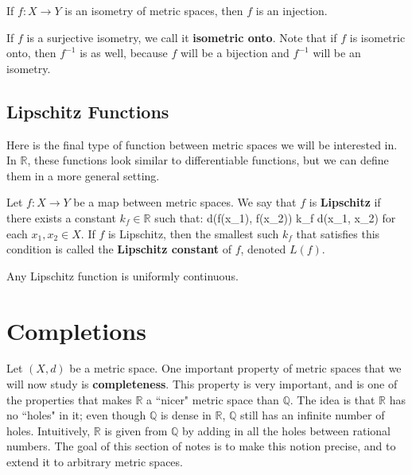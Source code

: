 	\begin{prop}
		If $f : X\rightarrow Y$ is an isometry of metric spaces, then $f$ is an injection.
	\end{prop}
	
	If $f$ is a surjective isometry, we call it \textbf{isometric onto}. Note that if $f$ is isometric onto, then $f^{-1}$ is as well, because $f$ will be a bijection and 
	$f^{-1}$ will be an isometry.
	
	\subsection{Lipschitz Functions}
	
	Here is the final type of function between metric spaces we will be interested in. In $\mathbb R$, these functions look similar to differentiable functions, but 
	we can define them in a more general setting.
	
	\begin{definition}[Lipschitz]
		Let $f : X\rightarrow Y$ be a map between metric spaces. We say that $f$ is \textbf{Lipschitz} if there exists a constant $k_f\in\mathbb R$ such that:
		\eq
			d(f(x_1), f(x_2)) \leq k_f d(x_1, x_2)
		\qe
		for each $x_1, x_2\in X$. If $f$ is Lipschitz, then the smallest such $k_f$ that satisfies this condition is called the \textbf{Lipschitz constant} of $f$, denoted 
		$L(f)$.
	\end{definition}
	
	\begin{prop}
		Any Lipschitz function is uniformly continuous.
	\end{prop}

\newpage	
\section{Completions}

	Let $(X, d)$ be a metric space. One important property of metric spaces that we will now study is \textbf{completeness}. This property is very important, and is 
	one of the properties that makes $\mathbb R$ a ``nicer" metric space than $\mathbb Q$. The idea is that $\mathbb R$ has no ``holes" in it; even though 
	$\mathbb Q$ is dense in $\mathbb R$, $\mathbb Q$ still has an infinite number of holes. Intuitively, $\mathbb R$ is given from $\mathbb Q$ by adding in all the 
	holes between rational numbers. The goal of this section of notes is to make this notion precise, and to extend it to arbitrary metric spaces. 
	
